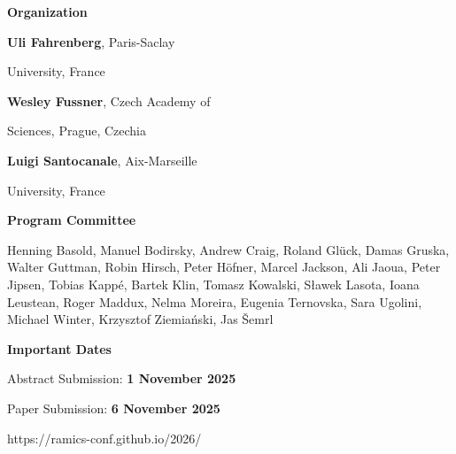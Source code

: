 \documentclass[a3paper, 12pt]{article}
\begin{document}
\begin{minipage}[t]{.43\linewidth}


  

  \vspace*{2ex}
  
  \hfill {\Large \bf Organization}

  \smallskip

  \hfill \textbf{Uli Fahrenberg}, Paris-Saclay

  \hfill University, France

  \hfill \textbf{Wesley Fussner}, Czech Academy of

  \hfill Sciences, Prague, Czechia

  \hfill \textbf{Luigi Santocanale}, Aix-Marseille

  \hfill University, France

  \bigskip

  \hfill {\Large \bf Program Committee}

  \medskip

Henning Basold,
Manuel Bodirsky,
Andrew Craig,
Roland Glück,
Damas Gruska,
Walter Guttman,
Robin Hirsch,
Peter Höfner,
Marcel Jackson,
Ali Jaoua,
Peter Jipsen,
Tobias Kappé,
Bartek Klin,
Tomasz Kowalski,
Sławek Lasota,
Ioana Leustean,
Roger Maddux,
Nelma Moreira,
Eugenia Ternovska,
Sara Ugolini,
Michael Winter,
Krzysztof Ziemiański,
Jas Šemrl
  
  \bigskip
  
  \hfill
  {\Large \bf Important Dates}

  \smallskip

  \hfill Abstract Submission: \textbf{1 November 2025}
  
  \hfill Paper Submission: \textbf{6 November 2025}
  


  \vspace{8ex}

  \hspace*{-15ex} {\fontsize{30}{40}\selectfont https://ramics-conf.github.io/2026/}

  \vspace*{-2ex}

\end{minipage}
\end{document}
